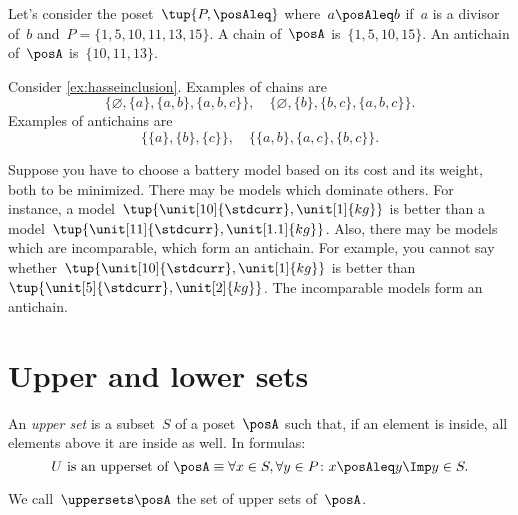 \begin{example}
  Let's consider the poset~$\tup{P,\posAleq}$ where~$a\posAleq b$ if~$a$ is a divisor of~$b$ and~$P=\{1,5,10,11,13,15\}$. A chain of~$\posA$ is~$\{1,5,10,15\}$. An antichain of~$\posA$ is~$\{10,11,13\}$.
\end{example}

\begin{example}
  Consider \cref{ex:hasseinclusion}. Examples of chains are
  \begin{equation}
    \{\varnothing,\{a\},\{a,b\},\{a,b,c\}\}, \quad  \{\varnothing,\{b\},\{b,c\},\{a,b,c\}\}.
  \end{equation}
  Examples of antichains are
  \begin{equation}
    \{\{a\},\{b\},\{c\}\}, \quad \{ \{a,b\},\{a,c\}, \{b,c\}\}.
  \end{equation}
\end{example}

\begin{example}
  \label{ex:battery}
  Suppose you have to choose a battery model based on its cost and its weight, both to be minimized.
  There may be models which dominate others.
  For instance, a model~$\tup{\unit[10]{\stdcurr},\unit[1]{kg}}$ is better than a model~$\tup{\unit[11]{\stdcurr},\unit[1.1]{kg}}$.
  Also, there may be models which are incomparable, which form an antichain.
  For example, you cannot say whether~$\tup{\unit[10]{\stdcurr},\unit[1]{kg}}$ is better than~$\tup{\unit[5]{\stdcurr},\unit[2]{kg}}$. The incomparable models form an antichain.
\end{example}


\section{Upper and lower sets}

\begin{definition}
  \label{def:upperset}
  An \emph{upper set} is a subset~$S$ of a poset~$\posA$ such
  that, if an element is inside, all elements above it are inside as well.
  In formulas:
  \begin{equation}
    \text{$U$ is an upperset of $\posA$} \equiv \forall x\in S, \forall y\in P\colon x\posAleq y \Imp y\in S.
  \end{equation}
\end{definition}
\begin{remark}
  We call~$\uppersets \posA$ the set of upper sets of~$\posA$.
\end{remark}

